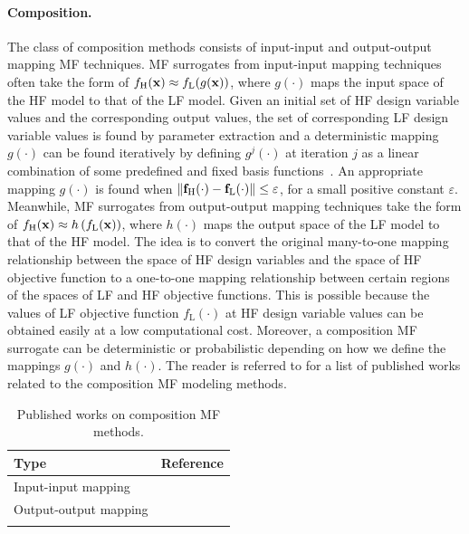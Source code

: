 \documentclass[journal ]{new-aiaa}
\newcommand{\edit}[1]{\textcolor{red!80!black}{#1}} %
\begin{document}
	\paragraph{Composition.}
	The class of composition methods consists of input-input and output-output mapping MF techniques.
	MF surrogates from input-input mapping techniques often take the form of
	{$f_\text{H}({\bf x}) \approx f_\text{L}(g({\bf x}))$,
		where
		$g(\cdot)$ maps the input space of the HF model to that of the LF model.}
	Given an initial set of HF design variable values and the corresponding output values, the set of corresponding LF design variable values is found by parameter extraction and a deterministic mapping $g(\cdot)$ can be found iteratively by defining  $g^j(\cdot)$ at iteration $j$ as a linear combination of some predefined and fixed basis functions~\citep{Bandler1994}.
	An appropriate mapping $g(\cdot)$ is found when $\| {\bf f}_\text{H}(\cdot) - {\bf f}_\text{L}(\cdot)\| \leq \varepsilon$, for a small positive constant $\varepsilon$. 
	Meanwhile, MF surrogates from output-output mapping techniques take the form of
	{$f_\text{H}({\bf x}) \approx h\left(f_\text{L}({\bf x})\right)$,
		where $h(\cdot)$ maps the output space of the LF model to that of the HF model.}
	The idea is to convert the original many-to-one mapping relationship between the space of HF design variables and the space of HF objective function to a one-to-one mapping relationship between certain regions of the spaces of LF and HF objective functions. 
	This is possible because the values of LF objective function $f_\text{L}(\cdot)$ at HF design variable values can be obtained easily at a low computational cost.
	Moreover, a composition MF surrogate can be deterministic or probabilistic depending on how we define the mappings $g(\cdot)$ and $h(\cdot)$.
	The reader is referred to  for a list of published works related to the composition MF modeling methods.
	
	\begin{table}
		\caption{Published works on composition MF methods.}
		\label{Table3}
		\centering
		\begin{tabularx}{\textwidth}{lX}
			\hline \noalign{\smallskip}
			Type & Reference\\
			\hline \noalign{\smallskip}
			Input-input mapping & \citet{Bandler1994,Bandler2004,Koziel2006,Robinson2008,TaoSiyu2019} \\
			\noalign{\smallskip}
			Output-output mapping &  \citet{Zheng2014,Zhou2017aei,Perdikaris2017,Jiang2018,Cutajar2019,Hebbal2021smo,Li2023}   \\
			\hline \noalign{\smallskip}
		\end{tabularx}
	\end{table}
	
\end{document}
